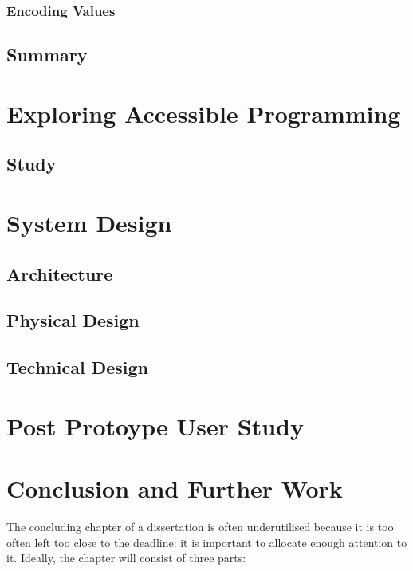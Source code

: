 \documentclass[oneside,%
                    author={Malak Hajji},
                    degree={BSc},
                    title={Designing An Accessible Computational Toolkit For Students},
                  subtitle={With Mixed Visual Abilities}]{dissertation}
\begin{document}
\subsection{Encoding Values}
\section{Summary}
\chapter{Exploring Accessible Programming}
\section{Study}

\chapter{System Design}
\section{Architecture}
\section{Physical Design}
\section{Technical Design}





\chapter{Post Protoype User Study}


\chapter{Conclusion and Further Work}
\label{chap:conclusion}

\noindent
The concluding chapter of a dissertation is often underutilised because it 
is too often left too close to the deadline: it is important to allocate
enough attention to it.  Ideally, the chapter will consist of three parts:
\end{document}
